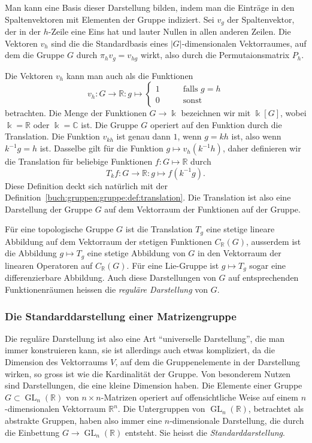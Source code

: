 Man kann eine Basis dieser Darstellung bilden, indem man die
Einträge in den Spaltenvektoren mit Elementen der Gruppe indiziert.
Sei $v_g$ der Spaltenvektor, der in der $h$-Zeile eine Eins
hat und lauter Nullen in allen anderen Zeilen.
Die Vektoren $v_h$ sind die die Standardbasis eines $|G|$-dimensionalen
Vektorraumes, auf dem die Gruppe $G$ durch
$\pi_{h}v_{g}=v_{hg}$ wirkt, also durch die Permutaionsmatrix $P_h$.

Die Vektoren $v_h$ kann man auch als die Funktionen
\[
v_h
\colon
G\to\mathbb{R}
:
g\mapsto
\begin{cases}
1&\qquad\text{falls $g=h$}\\
0&\qquad\text{sonst}
\end{cases}
\]
betrachten.
Die Menge der Funktionen $G\to\Bbbk$ bezeichnen wir mit $\Bbbk[G]$,
wobei $\Bbbk=\mathbb{R}$ oder $\Bbbk=\mathbb{C}$ ist.
Die Gruppe $G$ operiert auf den Funktion durch die Translation.
Die Funktion $v_{kh}$ ist genau dann $1$, wenn $g=kh$ ist, also wenn $k^{-1}g=h$
ist.
Dasselbe gilt für die Funktion $g\mapsto v_h(k^{-1}h)$, daher definieren wir
die Translation für beliebige Funktionen $f\colon G\mapsto \mathbb{R}$
durch
\[
T_kf\colon G\to\mathbb{R}:g\mapsto f(k^{-1}g).
\]
Diese Definition deckt sich natürlich mit der
Definition~\ref{buch:gruppen:gruppe:def:translation}.
Die Translation ist also eine Darstellung der Gruppe $G$ auf dem
Vektorraum der Funktionen auf der Gruppe.

Für eine topologische Gruppe $G$ ist die Translation $T_g$ eine 
stetige lineare Abbildung auf dem Vektorraum der stetigen Funktionen
$C_{\mathbb{R}}(G)$, ausserdem ist die Abbildung $g\mapsto T_g$ eine
stetige Abbildung von $G$ in den Vektorraum der linearen Operatoren
auf $C_{\mathbb{R}}(G)$.
Für eine Lie-Gruppe ist $g\mapsto T_g$ sogar eine differenzierbare
Abbildung.
Auch diese Darstellungen von $G$ auf entsprechenden Funktionenräumen
heissen die {\em reguläre Darstellung} von $G$.
%
%

%
%
\subsubsection{Die Standarddarstellung einer Matrizengruppe}
Die reguläre Darstellung ist also eine Art ``universelle Darstellung'',
die man immer konstruieren kann, sie ist allerdings auch etwas kompliziert,
da die Dimension des Vektorraums $V$, auf dem die Gruppenelemente in der
Darstellung wirken, so gross ist wie die Kardinalität der Gruppe.
Von besonderem Nutzen sind Darstellungen, die eine kleine Dimension haben.
Die Elemente einer Gruppe $G\subset\operatorname{GL}_n(\mathbb{R})$
von $n\times n$-Matrizen operiert auf offensichtliche Weise auf einem
$n$-dimensionalen Vektorraum $\mathbb{R}^n$.
Die Untergruppen von $\operatorname{GL}_n(\mathbb{R})$, betrachtet
als abstrakte Gruppen, haben also immer eine $n$-dimensionale Darstellung,
die durch die Einbettung $G\to \operatorname{GL}_n(\mathbb{R})$ entsteht.
Sie heisst die {\em Standarddarstellung}.

